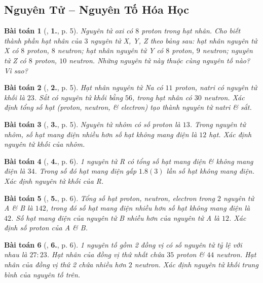 \documentclass{article}
\numberwithin{equation}{section}
\newtheorem{baitoan}{Bài toán}[section]
\begin{document}
\subsection{Nguyên Tử -- Nguyên Tố Hóa Học}

\begin{baitoan}[\cite{An2011}, \textbf{1.}, p. 5]
	Nguyên tử oxi có $8$ proton trong hạt nhân. Cho biết thành phần hạt nhân của $3$ nguyên tử X, Y, Z theo bảng sau: hạt nhân nguyên tử X có $8$ proton, $8$ neutron; hạt nhân nguyên tử Y có $8$ proton, $9$ neutron; nguyên tử Z có $8$ proton, $10$ neutron. Những nguyên tử này thuộc cùng nguyên tố nào? Vì sao?
\end{baitoan}

\begin{baitoan}[\cite{An2011}, \textbf{2.}, p. 5]
	Hạt nhân nguyên tử \emph{Na} có $11$ proton, natri có nguyên tử khối là $23$. Sắt có nguyên tử khối bằng $56$, trong hạt nhân có $30$ neutron. Xác định tổng số hạt (proton, neutron, \& electron) tạo thành nguyên tử natri \& sắt.
\end{baitoan}

\begin{baitoan}[\cite{An2011}, \textbf{3.}, p. 5]
	Nguyên tử nhôm có số proton là $13$. Trong nguyên tử nhôm, số hạt mang điện nhiều hơn số hạt không mang điện là $12$ hạt. Xác định nguyên tử khối của nhôm.
\end{baitoan}

\begin{baitoan}[\cite{An2011}, \textbf{4.}, p. 6]
	1 nguyên tử R có tổng số hạt mang điện \& không mang điện là $34$. Trong số đó hạt mang điện gấp $1.8(3)$ lần số hạt không mang điện. Xác định nguyên tử khối của R.
\end{baitoan}

\begin{baitoan}[\cite{An2011}, \textbf{5.}, p. 6]
	Tổng số hạt proton, neutron, electron trong $2$ nguyên tử A \& B là $142$, trong đó số hạt mang điện nhiều hơn số hạt không mang điện là $42$. Số hạt mang điện của nguyên tử B nhiều hơn của nguyên tử A là $12$. Xác định số proton của A \& B.
\end{baitoan}

\begin{baitoan}[\cite{An2011}, \textbf{6.}, p. 6]
	1 nguyên tố gồm 2 đồng vị có số nguyên tử tỷ lệ với nhau là $27:23$. Hạt nhân của đồng vị thứ nhất chứa $35$ proton \& $44$ neutron. Hạt nhân của đồng vị thứ 2 chứa nhiều hơn $2$ neutron. Xác định nguyên tử khối trung bình của nguyên tố trên.
\end{baitoan}
\end{document}

